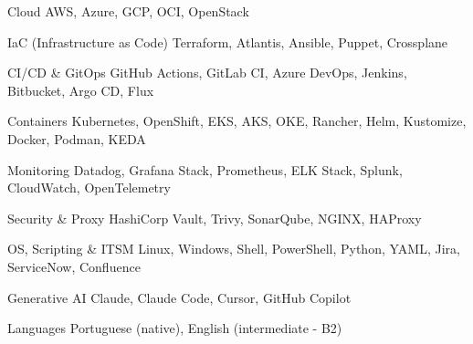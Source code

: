 
\begin{cvskills}

  \cvskill
    {Cloud} %
    {AWS, Azure, GCP, OCI, OpenStack} %

  \cvskill
    {IaC (Infrastructure as Code)} %
    {Terraform, Atlantis, Ansible, Puppet, Crossplane} %

  \cvskill
    {CI/CD \& GitOps} %
    {GitHub Actions, GitLab CI, Azure DevOps, Jenkins, Bitbucket, Argo CD, Flux} %

  \cvskill
    {Containers} %
    {Kubernetes, OpenShift, EKS, AKS, OKE, Rancher, Helm, Kustomize, Docker, Podman, KEDA} %

  \cvskill
    {Monitoring} %
    {Datadog, Grafana Stack, Prometheus, ELK Stack, Splunk, CloudWatch, OpenTelemetry} %

  \cvskill
    {Security \& Proxy} %
    {HashiCorp Vault, Trivy, SonarQube, NGINX, HAProxy} %

  \cvskill
    {OS, Scripting \& ITSM} %
    {Linux, Windows, Shell, PowerShell, Python, YAML, Jira, ServiceNow, Confluence} %

  \cvskill
    {Generative AI} %
    {Claude, Claude Code, Cursor, GitHub Copilot} %

  \cvskill
    {Languages} %
    {Portuguese (native), English (intermediate - B2)} %

\end{cvskills}
